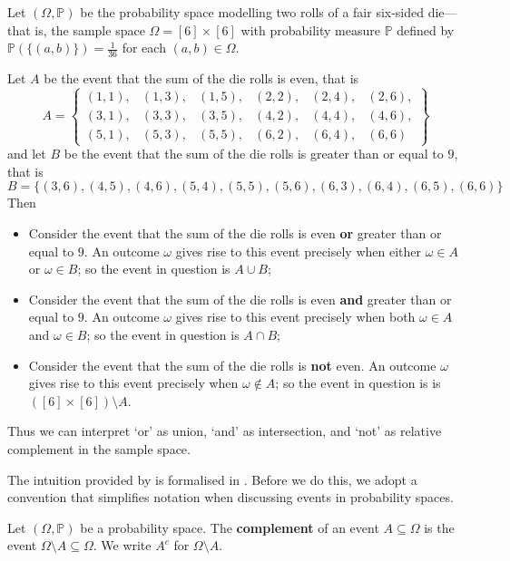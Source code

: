 \begin{example}
\label{exInformalOrAndNot}
Let $(\Omega,\mathbb{P})$ be the probability space modelling two rolls of a fair six-sided die---that is, the sample space $\Omega=[6] \times [6]$ with probability measure $\mathbb{P}$ defined by $\mathbb{P}(\{(a,b)\}) = \frac{1}{36}$ for each $(a,b) \in \Omega$.

Let $A$ be the event that the sum of the die rolls is even, that is
\[ A = \begin{Bmatrix}(1,1), & (1,3), & (1,5), & (2,2), & (2,4), & (2,6),\\
(3,1), & (3,3), & (3,5), & (4,2), & (4,4), & (4,6),\\
(5,1), & (5,3), & (5,5), & (6,2), & (6,4), & (6,6)\phantom{,}
\end{Bmatrix} \]
and let $B$ be the event that the sum of the die rolls is greater than or equal to $9$, that is
\[ B = \{ (3,6), (4,5), (4,6), (5,4), (5,5), (5,6), (6,3), (6,4), (6,5), (6,6) \} \]
Then
\begin{itemize}
\item Consider the event that the sum of the die rolls is even \textbf{or} greater than or equal to $9$. An outcome $\omega$ gives rise to this event precisely when either $\omega \in A$ or $\omega \in B$; so the event in question is $A \cup B$;
\item Consider the event that the sum of the die rolls is even \textbf{and} greater than or equal to $9$. An outcome $\omega$ gives rise to this event precisely when both $\omega \in A$ and $\omega \in B$; so the event in question is $A \cap B$;
\item Consider the event that the sum of the die rolls is \textbf{not} even. An outcome $\omega$ gives rise to this event precisely when $\omega \not \in A$; so the event in question is is $([6] \times [6]) \setminus A$.
\end{itemize}
Thus we can interpret `or' as union, `and' as intersection, and `not' as relative complement in the sample space.
\end{example}

The intuition provided by  is formalised in . Before we do this, we adopt a convention that simplifies notation when discussing events in probability spaces.

\begin{definition}
\label{defComplementOfEvent}
Let $(\Omega,\mathbb{P})$ be a probability space. The \textbf{complement} of an event $A \subseteq \Omega$ is the event $\Omega \setminus A \subseteq \Omega$. We write $A^c$  for $\Omega \setminus A$.
\end{definition}

